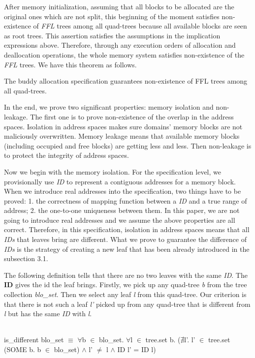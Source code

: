 \documentclass[runningheads]{llncs}
\begin{document}
After memory initialization, assuming that all blocks to be allocated are the original ones which are not split, this beginning of the moment satisfies non-existence of \emph{FFL} trees among all quad-trees because all available blocks are seen as root trees. This assertion satisfies the assumptions in the implication expressions above. Therefore, through any execution orders of allocation and deallocation operations, the whole memory system satisfies non-existence of the \emph{FFL} trees. We have this theorem as follows.

\begin{theorem}
The buddy allocation specification guarantees non-existence of FFL trees among all quad-trees.
\end{theorem}

In the end, we prove two significant properties: memory isolation and non-leakage. The first one is to prove non-existence of the overlap in the address spaces. Isolation in address spaces makes sure domains' memory blocks are not maliciously overwritten. Memory leakage means that available memory blocks (including occupied and free blocks) are getting less and less. Then non-leakage is to protect the integrity of address spaces.

Now we begin with the memory isolation. For the specification level, we provisionally use \emph{ID} to represent a contiguous addresses for a memory block. When we introduce real addresses into the specification, two things have to be proved: 1. the correctness of mapping function between a \emph{ID} and a true range of address; 2. the one-to-one uniqueness between them. In this paper, we are not going to introduce real addresses and we assume the above properties are all correct. Therefore, in this specification, isolation in address spaces means that all \emph{IDs} that leaves bring are different. What we prove to guarantee the difference of \emph{IDs} is the strategy of creating a new leaf that has been already introduced in the subsection 3.1.

The following definition tells that there are no two leaves with the same \emph{ID}. The \textbf{ID} gives the id the leaf brings. Firstly, we pick up any quad-tree \emph{b} from the tree collection \emph{blo\_set}. Then we select any leaf \emph{l} from this quad-tree. Our criterion is that there is not such a leaf \emph{l'} picked up from any quad-tree that is different from \emph{l} but has the same \emph{ID} with \emph{l}.

\begin{definition}  \\
is\_different blo\_set $\equiv$ $\forall$b $\in$ blo\_set. $\forall$l $\in$ tree.set b. ($\nexists$l'. l' $\in$ tree.set (SOME b. b $\in$ blo\_set) $\wedge$ l' $\ne$ l $\wedge$ ID l' = ID l)
\end{definition}
\end{document}

